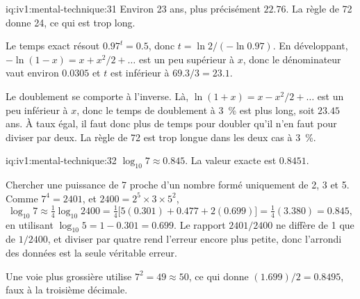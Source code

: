 \begin{solution}{iq:iv1:mental-technique:31}
Environ 23 ans, plus précisément $22.76$. La règle de 72 donne 24, ce qui est trop long.

Le temps exact résout $0.97^t = 0.5$, donc $t = \ln 2 / (-\ln 0.97)$. En développant, $-\ln(1 - x) = x + x^2/2 + \dots$ est un peu supérieur à $x$, donc le dénominateur vaut environ $0.0305$ et $t$ est inférieur à $69.3/3 = 23.1$.

Le doublement se comporte à l'inverse. Là, $\ln(1 + x) = x - x^2/2 + \dots$ est un peu inférieur à $x$, donc le temps de doublement à 3~\% est plus long, soit $23.45$ ans. À taux égal, il faut donc plus de temps pour doubler qu'il n'en faut pour diviser par deux. La règle de 72 est trop longue dans les deux cas à 3~\%.

\end{solution}

\begin{solution}{iq:iv1:mental-technique:32}
$\log_{10} 7 \approx 0.845$. La valeur exacte est $0.8451$.

Chercher une puissance de 7 proche d'un nombre formé uniquement de 2, 3 et 5. Comme $7^4 = 2401$, et $2400 = 2^5 \times 3 \times 5^2$,
\[
\log_{10} 7 \approx \tfrac14 \log_{10} 2400 = \tfrac14 \bigl[ 5(0.301) + 0.477 + 2(0.699) \bigr] = \tfrac14 (3.380) = 0.845,
\]
en utilisant $\log_{10} 5 = 1 - 0.301 = 0.699$. Le rapport $2401/2400$ ne diffère de 1 que de $1/2400$, et diviser par quatre rend l'erreur encore plus petite, donc l'arrondi des données est la seule véritable erreur.

Une voie plus grossière utilise $7^2 = 49 \approx 50$, ce qui donne $(1.699)/2 = 0.8495$, faux à la troisième décimale.

\end{solution}


